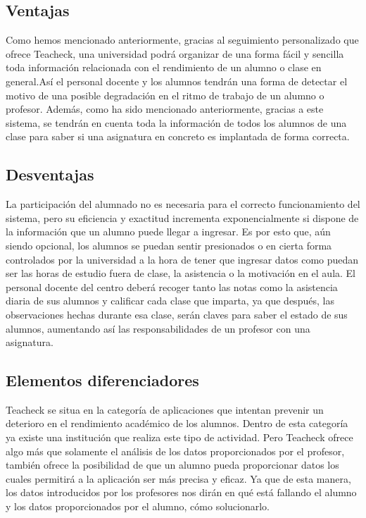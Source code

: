 \subsection{Ventajas}
Como hemos mencionado anteriormente, gracias al seguimiento
personalizado que ofrece Teacheck, una universidad podrá organizar de
una forma fácil y sencilla toda información relacionada con el
rendimiento de un alumno o clase en general.Así el personal docente y
los alumnos tendrán una forma de detectar el motivo de una posible
degradación en el ritmo de trabajo de un alumno o profesor.  Además,
como ha sido mencionado anteriormente, gracias a este sistema, se
tendrán en cuenta toda la información de todos los alumnos de una
clase para saber si una asignatura en concreto es implantada de forma
correcta.
\subsection{Desventajas}
La participación del alumnado no es necesaria para el correcto
funcionamiento del sistema, pero su eficiencia y exactitud incrementa
exponencialmente si dispone de la información que un alumno puede
llegar a ingresar. Es por esto que, aún siendo opcional, los alumnos
se puedan sentir presionados o en cierta forma controlados por la
universidad a la hora de tener que ingresar datos como puedan ser las
horas de estudio fuera de clase, la asistencia o la motivación en el
aula.  El personal docente del centro deberá recoger tanto las notas
como la asistencia diaria de sus alumnos y calificar cada clase que
imparta, ya que después, las observaciones hechas durante esa clase,
serán claves para saber el estado de sus alumnos, aumentando así las
responsabilidades de un profesor con una asignatura.
\subsection{Elementos diferenciadores}
Teacheck se situa en la categoría de aplicaciones que intentan
prevenir un deterioro en el rendimiento académico de los
alumnos. Dentro de esta categoría ya existe una institución que
realiza este tipo de actividad. Pero Teacheck ofrece algo más que
solamente el análisis de los datos proporcionados por el profesor,
también ofrece la posibilidad de que un alumno pueda proporcionar
datos los cuales permitirá a la aplicación ser más precisa y eficaz.
Ya que de esta manera, los datos introducidos por los profesores nos
dirán en qué está fallando el alumno y los datos proporcionados por el
alumno, cómo solucionarlo.
